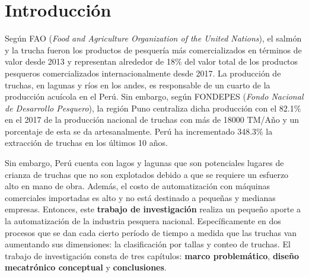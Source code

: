 
\newpage
\clearpage{\pagestyle{empty}\cleardoublepage}
\newpage

\chapter*{\centering \large Introducción} 

Según FAO (\textit{Food and Agriculture Organization of the United Nations}), el salmón y la trucha fueron los productos de pesquería más comercializados en términos de valor desde 2013 y representan alrededor de 18\% del valor total de los productos pesqueros comercializados internacionalmente desde 2017. \cite{FAO2017} La producción de truchas, en lagunas y ríos en los andes, es responsable de un cuarto de la producción acuícola en el Perú.\cite{SeafoodTradeIntelligencePortal2018} Sin embargo, según FONDEPES (\textit{Fondo Nacional de Desarrollo Pesquero}), la región Puno centraliza dicha producción con el 82.1\% en el 2017 de la producción nacional de truchas con más de 18000 TM/Año y un porcentaje de esta se da artesanalmente.\cite{FONDEPES2014} Perú ha incrementado 348.3\% la extracción de truchas en los últimos 10 años.\cite{MinisteriodelaProducciondelPeru2018}

Sin embargo, Perú cuenta con lagos y lagunas que son potenciales lugares de crianza de truchas que no son explotados debido a que se requiere un esfuerzo alto en mano de obra. Además, el costo de automatización con máquinas comerciales importadas es alto y no está destinado a pequeñas y medianas empresas. Entonces, este \textbf{trabajo de investigación} realiza un pequeño aporte a la automatización de la industria pesquera nacional. Específicamente en dos procesos que se dan cada cierto período de tiempo a medida que las truchas van aumentando sus dimensiones: la clasificación por tallas y conteo de truchas. El trabajo de investigación consta de tres capítulos: \textbf{marco problemático}, \textbf{diseño mecatrónico conceptual} y \textbf{conclusiones}.

